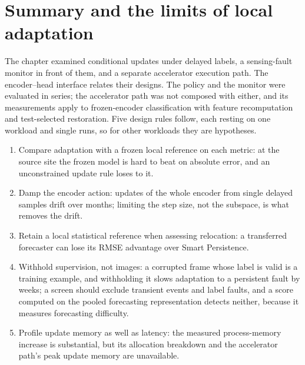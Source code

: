 \section{Summary and the limits of local adaptation}
\label{sec:ch4-summary}
The chapter examined conditional updates under delayed labels, a sensing-fault monitor in front of them, and a separate accelerator execution path. The encoder--head interface relates their designs. The policy and the monitor were evaluated in series; the accelerator path was not composed with either, and its measurements apply to frozen-encoder classification with feature recomputation and test-selected restoration. Five design rules follow, each resting on one workload and single runs, so for other workloads they are hypotheses.
\begin{enumerate}
  \item Compare adaptation with a frozen local reference on each metric: at the source site the frozen model is hard to beat on absolute error, and an unconstrained update rule loses to it.
  \item Damp the encoder action: updates of the whole encoder from single delayed samples drift over months; limiting the step size, not the subspace, is what removes the drift.
  \item Retain a local statistical reference when assessing relocation: a transferred forecaster can lose its RMSE advantage over Smart Persistence.
  \item Withhold supervision, not images: a corrupted frame whose label is valid is a training example, and withholding it slows adaptation to a persistent fault by weeks; a screen should exclude transient events and label faults, and a score computed on the pooled forecasting representation detects neither, because it measures forecasting difficulty.
  \item Profile update memory as well as latency: the measured process-memory increase is substantial, but its allocation breakdown and the accelerator path's peak update memory are unavailable.
\end{enumerate}

